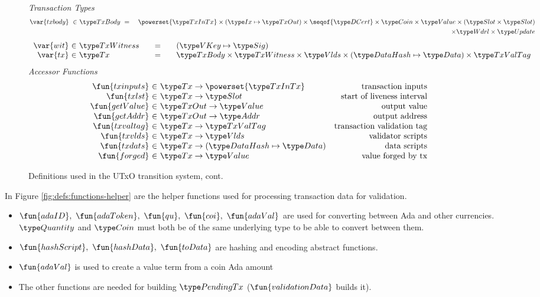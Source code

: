 \begin{figure*}[htb]
  \emph{Transaction Types}
  \begin{align*}
    \var{txbody} ~\in~
    & \TxBody ~=~
    & \powerset{\TxInTx} \times (\Ix \mapsto \TxOut) \times \seqof{\DCert}
      \times \Coin \times \Value \times (\Slot\times\Slot) \\
    & ~& \times \Wdrl \times \Update
  \end{align*}
  \begin{equation*}
    \begin{array}{r@{~\in~}l@{\qquad=\qquad}l}
      \var{wit} & \TxWitness & (\VKey \mapsto \Sig)
      \\
      \var{tx}
      & \Tx
      & \TxBody \times \TxWitness \times \Vlds \times (\HashDat \mapsto \Data) \times \TxValTag
    \end{array}
  \end{equation*}
  \emph{Accessor Functions}
  \begin{equation*}
    \begin{array}{r@{~\in~}lr}
      \fun{txinputs} & \Tx \to \powerset{\TxInTx} & \text{transaction inputs} \\
      \fun{txlst} & \Tx \to \Slot & \text{start of liveness interval} \\
      \fun{getValue} & \TxOut \to \Value & \text{output value} \\
      \fun{getAddr} & \TxOut \to \Addr & \text{output address} \\
      \fun{txvaltag} & \Tx \to \TxValTag & \text{transaction validation tag}\\
      \fun{txvlds} & \Tx \to \Vlds & \text{validator scripts}\\
      \fun{txdats} & \Tx \to (\HashDat \mapsto \Data) & \text{data scripts}\\
      \fun{forged} & \Tx \to \Value & \text{value forged by tx}\\
    \end{array}
  \end{equation*}
  \caption{Definitions used in the UTxO transition system, cont.}
  \label{fig:defs:utxo-shelley-2}
\end{figure*}


In Figure \ref{fig:defs:functions-helper} are the helper functions used for
processing transaction data for validation.

\begin{itemize}
  \item $\fun{adaID},~\fun{adaToken},~\fun{qu},~\fun{coi},~\fun{adaVal}$ are used
  for converting between Ada and other currencies. $\Quantity$ and $\Coin$
  must both be of the same underlying type to be able to convert between them.
  \item $\fun{hashScript},~ \fun{hashData},~\fun{toData}$ are hashing and encoding
  abstract functions.
  \item $\fun{adaVal}$ is used to create a value term from a coin Ada amount
  \item The other functions are needed for building $\PendingTx$
  ($\fun{validationData}$ builds it).
\end{itemize}

